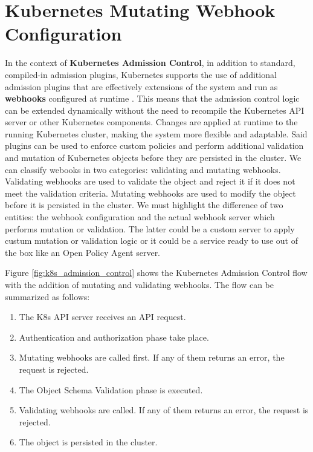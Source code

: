 \section{Kubernetes Mutating Webhook Configuration}

In the context of \textbf{Kubernetes Admission Control}, in addition to standard, compiled-in admission plugins, Kubernetes supports the use of additional admission plugins that are effectively extensions of the system and run as \textbf{webhooks} configured at runtime \cite{kubernetes_dynamic_admission_control}. 
This means that the admission control logic can be extended dynamically without the need to recompile the Kubernetes API server or other Kubernetes components. 
Changes are applied at runtime to the running Kubernetes cluster, making the system more flexible and adaptable.
Said plugins can be used to enforce custom policies and perform additional validation and mutation of Kubernetes objects before they are persisted in the cluster.
We can classify webooks in two categories: validating and mutating webhooks.
Validating webhooks are used to validate the object and reject it if it does not meet the validation criteria.
Mutating webhooks are used to modify the object before it is persisted in the cluster.
We must highlight the difference of two entities: the webhook configuration and the actual webhook server which performs mutation or validation.
The latter could be a custom server to apply custum mutation or validation logic or it could be a service ready to use out of the box like an Open Policy Agent server.

Figure \ref{fig:k8s_admission_control} shows the Kubernetes Admission Control flow with the addition of mutating and validating webhooks.
The flow can be summarized as follows:
\begin{enumerate}[itemsep=0.2pt, topsep=1pt]
  \item The K8s API server receives an API request.
  \item Authentication and authorization phase take place.
  \item Mutating webhooks are called first. If any of them returns an error, the request is rejected.
  \item The Object Schema Validation phase is executed.
  \item Validating webhooks are called. If any of them returns an error, the request is rejected.
  \item The object is persisted in the cluster.
\end{enumerate}

